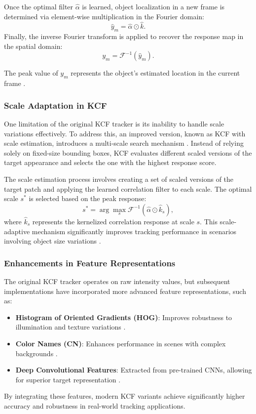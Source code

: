 Once the optimal filter $\hat{\alpha}$ is learned, object localization in a new frame is determined via element-wise multiplication in the Fourier domain:
\begin{equation}
    \hat{y}_m = \hat{\alpha} \odot \hat{k}.
\end{equation}
Finally, the inverse Fourier transform is applied to recover the response map in the spatial domain:
\begin{equation}
    y_m = \mathcal{F}^{-1}(\hat{y}_m).
\end{equation}

The peak value of $y_m$ represents the object's estimated location in the current frame \cite{henriques2014high}.

\subsubsection{Scale Adaptation in KCF}
One limitation of the original KCF tracker is its inability to handle scale variations effectively. To address this, an improved version, known as KCF with scale estimation, introduces a multi-scale search mechanism \cite{danelljan2014accurate}. Instead of relying solely on fixed-size bounding boxes, KCF evaluates different scaled versions of the target appearance and selects the one with the highest response score.

The scale estimation process involves creating a set of scaled versions of the target patch and applying the learned correlation filter to each scale. The optimal scale $s^*$ is selected based on the peak response:
\begin{equation}
    s^* = \arg\max_s \mathcal{F}^{-1}(\hat{\alpha} \odot \hat{k}_s),
\end{equation}
where $\hat{k}_s$ represents the kernelized correlation response at scale $s$. This scale-adaptive mechanism significantly improves tracking performance in scenarios involving object size variations \cite{danelljan2016discriminative}.

\subsubsection{Enhancements in Feature Representations}
The original KCF tracker operates on raw intensity values, but subsequent implementations have incorporated more advanced feature representations, such as:
\begin{itemize}
    \item \textbf{Histogram of Oriented Gradients (HOG)}: Improves robustness to illumination and texture variations \cite{felzenszwalb2010object}.
    \item \textbf{Color Names (CN)}: Enhances performance in scenes with complex backgrounds \cite{danelljan2014adaptive}.
    \item \textbf{Deep Convolutional Features}: Extracted from pre-trained CNNs, allowing for superior target representation \cite{wang2015transferring}.
\end{itemize}
By integrating these features, modern KCF variants achieve significantly higher accuracy and robustness in real-world tracking applications.

